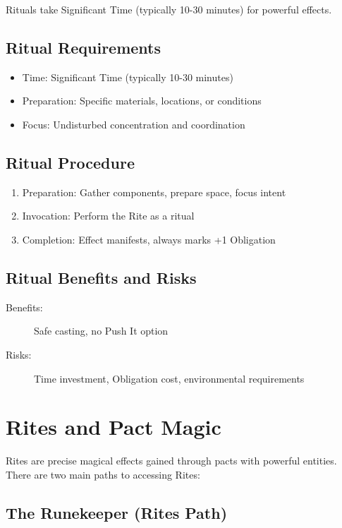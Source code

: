 \documentclass[11pt,twoside,openany]{book}
\begin{document}
Rituals take Significant Time (typically 10-30 minutes) for powerful effects.

\subsection*{Ritual Requirements}

\begin{itemize}
\item Time: Significant Time (typically 10-30 minutes)
\item Preparation: Specific materials, locations, or conditions
\item Focus: Undisturbed concentration and coordination
\end{itemize}

\subsection*{Ritual Procedure}

\begin{enumerate}
\item Preparation: Gather components, prepare space, focus intent
\item Invocation: Perform the Rite as a ritual
\item Completion: Effect manifests, always marks +1 Obligation
\end{enumerate}

\subsection*{Ritual Benefits and Risks}

\begin{description}
\item[Benefits:] Safe casting, no Push It option
\item[Risks:] Time investment, Obligation cost, environmental requirements
\end{description}

\section*{Rites and Pact Magic} 

Rites are precise magical effects gained through pacts with powerful entities. There are two main paths to accessing Rites:

\subsection*{The Runekeeper (Rites Path)}
\end{document}

